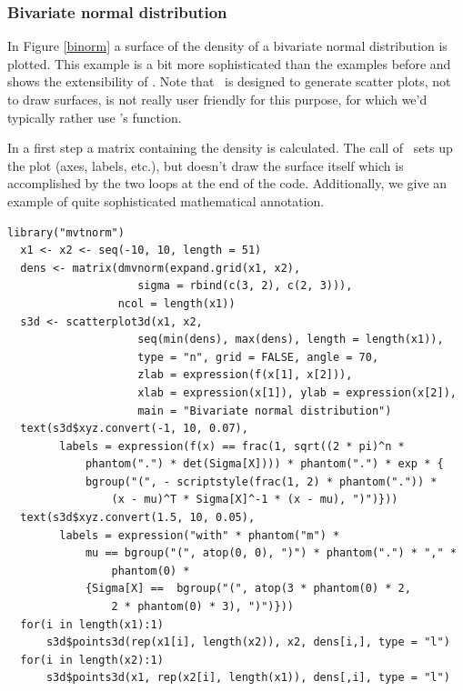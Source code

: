 \subsubsection{Bivariate normal distribution}
In Figure \ref{binorm} a surface of the density of a bivariate normal
distribution is plotted.  This example is a bit more sophisticated than the
examples before and shows the extensibility of \sdd.  Note that \sdd\
is designed to generate  scatter plots, not to draw surfaces,
is not really user friendly for this purpose, for which we'd typically
rather use \RR's \code{persp} function.

In a first step a matrix containing the density is calculated.
The call of \sdd\ sets up the plot (axes, labels, etc.), but doesn't draw
the surface itself which is accomplished by the two loops at the end of the
code.  Additionally, we give an example of quite sophisticated mathematical
annotation.
\clearpage
\small
\begin{Verbatim}[frame=single]
  library("mvtnorm")
  x1 <- x2 <- seq(-10, 10, length = 51)
  dens <- matrix(dmvnorm(expand.grid(x1, x2),
                    sigma = rbind(c(3, 2), c(2, 3))),
                 ncol = length(x1))
  s3d <- scatterplot3d(x1, x2,
                    seq(min(dens), max(dens), length = length(x1)),
                    type = "n", grid = FALSE, angle = 70,
                    zlab = expression(f(x[1], x[2])),
                    xlab = expression(x[1]), ylab = expression(x[2]),
                    main = "Bivariate normal distribution")
  text(s3d$xyz.convert(-1, 10, 0.07),
        labels = expression(f(x) == frac(1, sqrt((2 * pi)^n *
            phantom(".") * det(Sigma[X]))) * phantom(".") * exp * {
            bgroup("(", - scriptstyle(frac(1, 2) * phantom(".")) *
                (x - mu)^T * Sigma[X]^-1 * (x - mu), ")")}))
  text(s3d$xyz.convert(1.5, 10, 0.05),
        labels = expression("with" * phantom("m") *
            mu == bgroup("(", atop(0, 0), ")") * phantom(".") * "," *
                phantom(0) *
            {Sigma[X] ==  bgroup("(", atop(3 * phantom(0) * 2,
                2 * phantom(0) * 3), ")")}))
  for(i in length(x1):1)
      s3d$points3d(rep(x1[i], length(x2)), x2, dens[i,], type = "l")
  for(i in length(x2):1)
      s3d$points3d(x1, rep(x2[i], length(x1)), dens[,i], type = "l")
\end{Verbatim}
\normalsize

